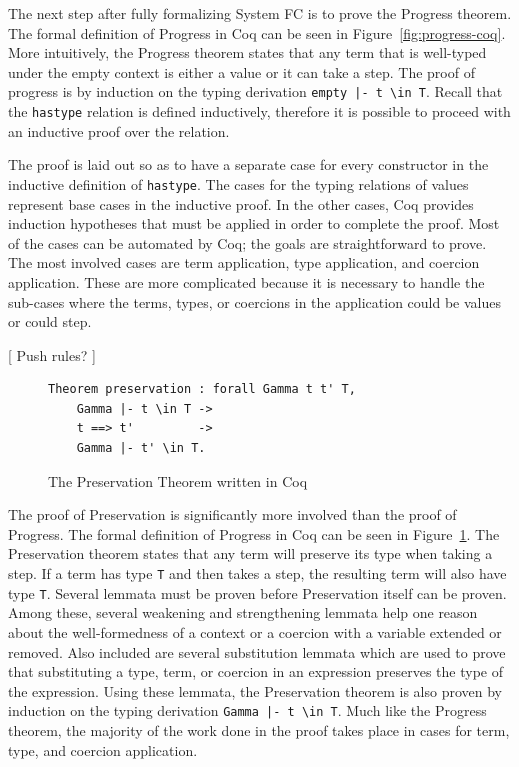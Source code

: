 \documentclass{sig-alternate}
\begin{document}
The next step after fully formalizing System FC is to prove the Progress theorem. The formal definition of Progress in Coq can be seen in Figure~\ref{fig:progress-coq}. More intuitively, the Progress theorem states that any term that is well-typed under the empty context is either a value or it can take a step. The proof of progress is by induction on the typing derivation \texttt{empty |- t \textbackslash in T}. Recall that the \texttt{has\textunderscore type} relation is defined inductively, therefore it is possible to proceed with an inductive proof over the relation.

The proof is laid out so as to have a separate case for every constructor in the inductive definition of \texttt{has\textunderscore type}. The cases for the typing relations of values represent base cases in the inductive proof. In the other cases, Coq provides induction hypotheses that must be applied in order to complete the proof. Most of the cases can be automated by Coq; the goals are straightforward to prove. The most involved cases are term application, type application, and coercion application. These are more complicated because it is necessary to handle the sub-cases where the terms, types, or coercions in the application could be values or could step.

[ Push rules? ]

\begin{figure}[h!]
\begin{lstlisting}
Theorem preservation : forall Gamma t t' T, 
    Gamma |- t \in T ->
    t ==> t'         ->
    Gamma |- t' \in T.
\end{lstlisting}
\caption{The Preservation Theorem written in Coq}
\label{fig:preservation-coq}
\end{figure}

The proof of Preservation is significantly more involved than the proof of Progress. The formal definition of Progress in Coq can be seen in Figure~\ref{fig:preservation-coq}. The Preservation theorem states that any term will preserve its type when taking a step. If a term has type \texttt{T} and then takes a step, the resulting term will also have type \texttt{T}. Several lemmata must be proven before Preservation itself can be proven. Among these, several weakening and strengthening lemmata help one reason about the well-formedness of a context or a coercion with a variable extended or removed. Also included are several substitution lemmata which are used to prove that substituting a type, term, or coercion in an expression preserves the type of the expression. Using these lemmata, the Preservation theorem is also proven by induction on the typing derivation \texttt{Gamma |- t \textbackslash in T}. Much like the Progress theorem, the majority of the work done in the proof takes place in cases for term, type, and coercion application.
\end{document}
